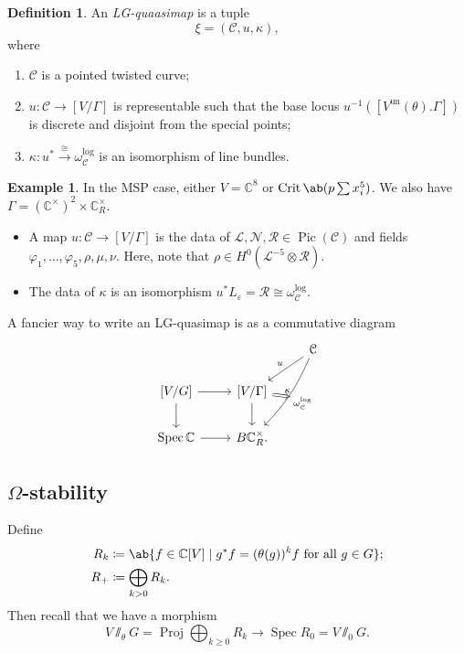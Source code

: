 \documentclass[10pt]{amsart}
\theoremstyle{definition}
\newtheorem{defn}[thm]{Definition}
\newtheorem{exm}[thm]{Example}
\theoremstyle{remark}
\theoremstyle{plain}
\theoremstyle{definition}
\theoremstyle{remark}
\newcommand{\C}{\mathbb{C}}
\newcommand{\ep}{\varepsilon}
\newcommand{\mc}[1]{\mathcal{#1}}
\newcommand{\mr}[1]{\mathrm{#1}}
\newcommand{\on}[1]{\operatorname{#1}}
\newcommand{\1}{\mathbf{1}}
\newcommand{\2}{\mathbf{2}}
\newcommand{\3}{\mathbf{3}}
\DeclareMathOperator{\Pic}{Pic}
\DeclareMathOperator{\Spec}{Spec}
\DeclareMathOperator{\Proj}{Proj}
\begin{document}
\begin{defn}
    An \textit{LG-quaasimap} is a tuple
    \[ \xi = (\mc{C}, u, \kappa), \]
    where
    \begin{enumerate}
        \item $\mc{C}$ is a pointed twisted curve;
        \item $u \colon \mc{C} \to [V/\Gamma]$ is representable such that the base locus $u^{-1}([V^{\mr{un}}(\theta).\Gamma])$ is discrete and disjoint from the special points;
        \item $\kappa \colon u^* \xrightarrow{\cong} \omega_{\mc{C}}^{\log}$ is an isomorphism of line bundles.
    \end{enumerate}
\end{defn}

\begin{exm}
    In the MSP case, either $V = \C^8$ or $\on{Crit} \ab(p \sum x_i^5)$. We also have $\Gamma = (\C^{\times})^2 \times \C^{\times}_R$.
    \begin{itemize}
        \item A map $u \colon \mc{C} \to [V/\Gamma]$ is the data of $\mc{L}, \mc{N}, \mc{R} \in \Pic(\mc{C})$ and fields $\varphi_1, \ldots, \varphi_5, \rho, \mu, \nu$. Here, note that $\rho \in H^0(\mc{L}^{-5} \otimes \mc{R})$.
        \item The data of $\kappa$ is an isomorphism $u^* L_{\ep} = \mc{R} \cong \omega_{\mc{C}}^{\log}$.
    \end{itemize}
\end{exm}

A fancier way to write an LG-quasimap is as a commutative diagram
\begin{equation*}
\begin{tikzcd}
    & & \mc{C} \ar[swap]{dl}{u} \ar[bend left=10,""{name=F}]{ddl}{\omega_{\mc{C}}^{\log}} \\
    { [V/G] } \ar{r} \ar{d} & { [V/\Gamma] } \ar{d} \ar[Rightarrow,to=F,"\kappa"]  \\
    \Spec \C \ar{r} & B \C^{\times}_R.
\end{tikzcd}
\end{equation*}

\subsection{$\Omega$-stability}%
\label{sub:Omega-stability}

Define
\begin{align*}
    R_k &\coloneqq \ab\{ f \in \C[V] \mid g^* f = (\theta(g))^k f\text{ for all } g \in G \};\\
    R_+ &\coloneqq \bigoplus_{k >0} R_k.
\end{align*}
Then recall that we have a morphism
\[ V \sslash_{\theta} G = \Proj \bigoplus_{k \geq 0} R_k \to \Spec R_0 = V \sslash_0 G. \]
\end{document}
